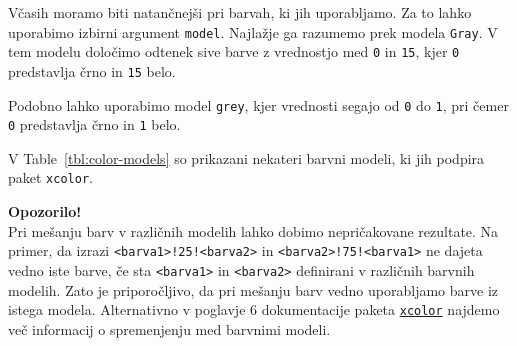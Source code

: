 Včasih moramo biti natančnejši pri barvah, ki jih uporabljamo. Za to lahko uporabimo izbirni argument \texttt{model}. Najlažje ga razumemo prek modela \texttt{Gray}. V tem modelu določimo odtenek sive barve z vrednostjo med \texttt{0} in \texttt{15}, kjer \texttt{0} predstavlja črno in \texttt{15} belo.

Podobno lahko uporabimo model \texttt{grey}, kjer vrednosti segajo od \texttt{0} do \texttt{1}, pri čemer \texttt{0} predstavlja črno in \texttt{1} belo.

V Table~\ref{tbl:color-models} so prikazani nekateri barvni modeli, ki jih podpira paket \texttt{xcolor}.


\begin{framed}
\textbf{Opozorilo!}\\
Pri mešanju barv v različnih modelih lahko dobimo nepričakovane rezultate. Na primer, da izrazi \texttt{\textless barva1\textgreater !25!\textless barva2\textgreater } in \texttt{\textless barva2\textgreater !75!\textless barva1\textgreater } ne dajeta vedno iste barve, če sta \texttt{\textless barva1\textgreater } in \texttt{\textless barva2\textgreater } definirani v različnih barvnih modelih.
Zato je priporočljivo, da pri mešanju barv vedno uporabljamo barve iz istega modela.
Alternativno v poglavje 6 dokumentacije paketa \href{https://ctan.org/pkg/xcolor?lang=en}{\texttt{xcolor}} najdemo več informacij o spremenjenju med barvnimi modeli.
\end{framed}

